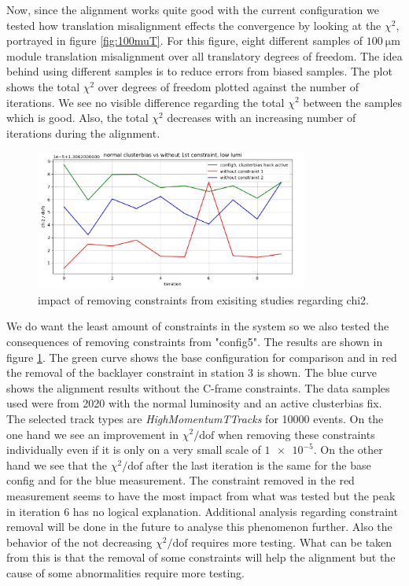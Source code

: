 Now, since the alignment works quite good with the current configuration we
tested how translation misalignment effects the convergence by looking at the
$\chi^2$, portrayed in figure \ref{fig:100muT}. For this figure, eight different samples of $\SI{100}{\micro\metre}$ module translation misalignment over all translatory
degrees of freedom. The idea behind using different samples is to reduce errors
from biased samples. The plot shows the total $\chi^2$ over degrees of freedom
plotted against the number of iterations. We see no visible difference regarding
the total $\chi^2$ between the samples which is good.
Also, the total $\chi^2$ decreases with an increasing number of iterations
during the alignment.

\begin{figure}
  \centering
  \includegraphics[width=0.8\textwidth]{plots/feb_6_2022/low_lumi_removed_constraints_vs_normal.png}
  \caption{impact of removing constraints from exisiting studies regarding chi2.}
  \label{fig:removeConst}
\end{figure}

We do want the least amount of constraints in the system so we also tested
the consequences of removing constraints from "config5".
The results are shown in figure \ref{fig:removeConst}.
The green curve shows the base configuration for comparison and in red the removal of the backlayer constraint in station 3 is shown. The blue curve shows the alignment results without the C-frame constraints.
The data samples used were from 2020 with the normal luminosity and an active clusterbias fix.
The selected track types are \textit{HighMomentumTTracks} for 10000 events.
On the one hand we see an improvement in $\chi^2 / \text{dof}$ when removing these constraints individually even if it is only on a very small scale of $\num{1e-5}$. On the
other hand we see that the $\chi^2 / \text{dof}$ after the last iteration is the same for the base config and for the blue measurement. The constraint removed in the red measurement seems to have the most impact from what was tested but the peak in iteration 6 has no logical
explanation. Additional analysis regarding constraint removal will be done in the future to analyse this phenomenon further.
Also the behavior of the not decreasing $\chi^2 / \text{dof}$ requires more testing.
What can be taken from this is that the removal of some constraints will help
the alignment but the cause of some abnormalities require more testing.

